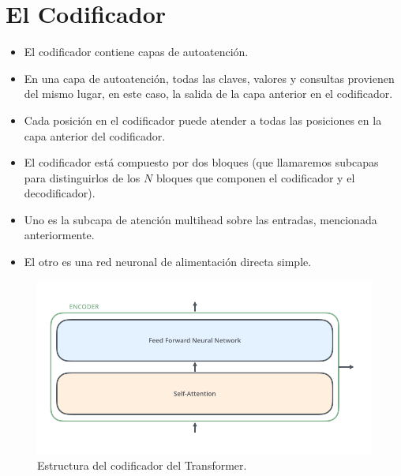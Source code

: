 \section{El Codificador}
\begin{itemize}
\item El codificador contiene capas de autoatención.

\item En una capa de autoatención, todas las claves, valores y consultas provienen del mismo lugar, en este caso, la salida de la capa anterior en el codificador.

\item Cada posición en el codificador puede atender a todas las posiciones en la capa anterior del codificador.

\item El codificador está compuesto por dos bloques (que llamaremos subcapas para distinguirlos de los $N$ bloques que componen el codificador y el decodificador).

\item Uno es la subcapa de atención multihead sobre las entradas, mencionada anteriormente.

\item El otro es una red neuronal de alimentación directa simple.

\end{itemize}

\begin{figure}[h]
\centering
\includegraphics[scale=0.35]{pics/Transformer_encoder.png}
\caption{Estructura del codificador del Transformer.}
\end{figure}

